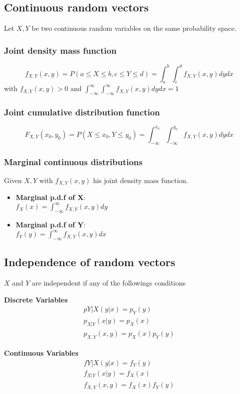 \subsection{Continuous random vectors}
Let $X, Y$ be two continuous random variables on the same probability space.
\subsubsection{Joint density mass function}
\[ f_{X,Y}(x,y)=P(a\leq X \leq b, c\leq Y \leq d) = \int_{a}^b\int_{c}^d
f_{X,Y}(x,y)dydx \] with $f_{X,Y}(x,y)>0$ and
$\int_{-\infty}^\infty\int_{-\infty}^\infty f_{X,Y}(x,y)dydx=1$
\subsubsection{Joint cumulative distribution function}
\[ F_{X,Y}(x_0,y_0)=P(X\leq x_0,Y\leq y_0) =
\int_{-\infty}^{x_0}\int_{-\infty}^{y_0}f_{X,Y}(x,y)dydx \]
\subsubsection{Marginal continuous distributions}
Given $X, Y$ with $f_{X,Y}(x,y)$ his joint density mass function.
\begin{itemize}
    \item \textbf{Marginal p.d.f of X}:\\ $f_X(x)=\int_{-\infty}^\infty
    f_{X,Y}(x,y)dy$
    \item \textbf{Marginal p.d.f of Y}:\\ $f_Y(y)=\int_{-\infty}^\infty
    f_{X,Y}(x,y)dx$
\end{itemize}


\subsection{Independence of random vectors}
$X$ and $Y$ are independent if any of the followings conditions
\setlength{\columnseprule}{1pt}
\begin{multicols}{2}
    \textbf{Discrete Variables} \begin{multline*} 
        p{Y|X}(y|x)=p_Y(y)\\
        p_{X|Y}(x|y)=p_X(x)\\
        p_{X,Y}(x,y)=p_X(x)p_Y(y)
    \end{multline*}

    \textbf{Continuous Variables} \begin{multline*}
        f{Y|X}(y|x)=f_Y(y)\\
        f_{X|Y}(x|y)=f_X(x)\\
        f_{X,Y}(x,y)=f_X(x)f_Y(y)
    \end{multline*}
\end{multicols}

